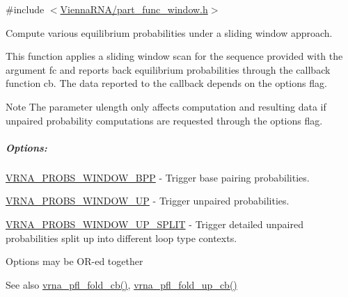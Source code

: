 {\ttfamily \#include $<$\hyperlink{part__func__window_8h}{Vienna\+R\+N\+A/part\+\_\+func\+\_\+window.\+h}$>$}



Compute various equilibrium probabilities under a sliding window approach. 

This function applies a sliding window scan for the sequence provided with the argument {\ttfamily fc} and reports back equilibrium probabilities through the callback function {\ttfamily cb}. The data reported to the callback depends on the {\ttfamily options} flag.

\begin{DoxyNote}{Note}
The parameter {\ttfamily ulength} only affects computation and resulting data if unpaired probability computations are requested through the {\ttfamily options} flag.
\end{DoxyNote}
\subparagraph*{Options\+:}


\begin{DoxyItemize}
\item \hyperlink{group__part__func__window_ga296217b76e76e5f7e6927e7210aa9b1f}{V\+R\+N\+A\+\_\+\+P\+R\+O\+B\+S\+\_\+\+W\+I\+N\+D\+O\+W\+\_\+\+B\+PP} -\/ Trigger base pairing probabilities.
\item \hyperlink{group__part__func__window_ga18325811c7dfc7b7d9d4ac37f4353615}{V\+R\+N\+A\+\_\+\+P\+R\+O\+B\+S\+\_\+\+W\+I\+N\+D\+O\+W\+\_\+\+UP} -\/ Trigger unpaired probabilities.
\item \hyperlink{group__part__func__window_ga9068f4ec008bf1c042a9357f5c2c5e13}{V\+R\+N\+A\+\_\+\+P\+R\+O\+B\+S\+\_\+\+W\+I\+N\+D\+O\+W\+\_\+\+U\+P\+\_\+\+S\+P\+L\+IT} -\/ Trigger detailed unpaired probabilities split up into different loop type contexts.
\end{DoxyItemize}

Options may be O\+R-\/ed together

\begin{DoxySeeAlso}{See also}
\hyperlink{group__part__func__window_ga457a60751b2a5225477e3b7735636a5f}{vrna\+\_\+pfl\+\_\+fold\+\_\+cb()}, \hyperlink{group__part__func__window_gac3251d3da0238d6d9ffdd6703b00f1d3}{vrna\+\_\+pfl\+\_\+fold\+\_\+up\+\_\+cb()}
\end{DoxySeeAlso}

